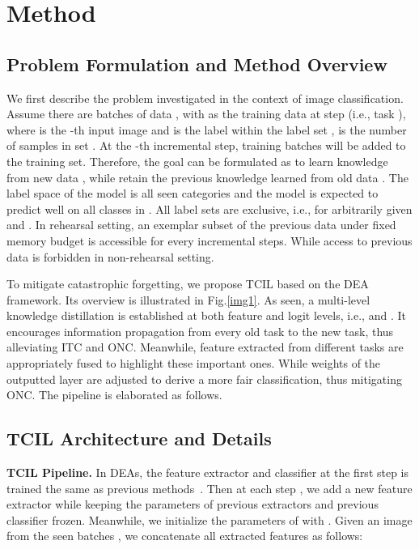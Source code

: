 \documentclass[letterpaper]{article} \usepackage{aaai23}  \usepackage{times}  \usepackage{helvet}  \usepackage{courier}  \usepackage[hyphens]{url}  \usepackage{graphicx} \urlstyle{rm} \def\UrlFont{\rm}  \usepackage{natbib}  \usepackage{caption} \frenchspacing  \setlength{\pdfpagewidth}{8.5in}  \setlength{\pdfpageheight}{11in}  \usepackage{algorithm}
\begin{document}
\section{Method}

\subsection{Problem Formulation and Method Overview}
We first describe the problem investigated in the context of image classification. Assume there are  batches of data , with  as the training data at step  (i.e., task ), where  is the -th input image and  is the label within the label set ,  is the number of samples in set . At the -th incremental step, training batches  will be added to the training set. Therefore, the goal can be formulated as to learn knowledge from new data , while retain the previous knowledge learned from old data . The label space of the model is all seen categories  and the model is expected to predict well on all classes in . All label sets are exclusive, i.e.,  for arbitrarily given  and . In rehearsal setting, an exemplar subset of the previous data under fixed memory budget is accessible for every incremental steps. While access to previous data is forbidden in non-rehearsal setting.

To mitigate catastrophic forgetting, we propose TCIL based on the DEA framework. Its overview is illustrated in Fig.\ref{img1}. As seen, a multi-level knowledge distillation is established at both feature and logit levels, i.e.,  and . It encourages information propagation from every old task to the new task, thus alleviating ITC and ONC. Meanwhile, feature extracted from different tasks are appropriately fused to highlight these important ones. While weights of the outputted layer are adjusted to derive a more fair classification, thus mitigating ONC. The pipeline is elaborated as follows.

\subsection{TCIL Architecture and Details}

\textbf{TCIL Pipeline.} 
In DEAs, the feature extractor  and classifier  at the first step is trained the same as previous methods~\cite{p24, e2, w20, t54}. Then at each step , we add a new feature extractor  while keeping the parameters of previous extractors  and previous classifier  frozen. Meanwhile, we initialize the parameters of  with . Given an image  from the seen batches , we concatenate all extracted features  as follows:
\end{document}
